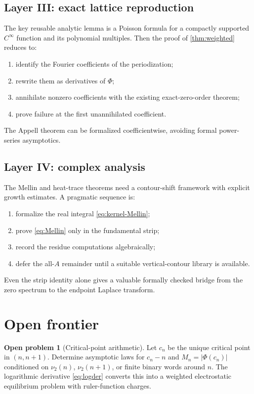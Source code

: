 \documentclass[11pt,oneside]{article}
\numberwithin{equation}{section}
\theoremstyle{definition}
\newtheorem{problem}[theorem]{Open problem}
\theoremstyle{remark}
\begin{document}
\subsection{Layer III: exact lattice reproduction}

The key reusable analytic lemma is a Poisson formula for a compactly supported
$C^\infty$ function and its polynomial multiples.  Then the proof of
\cref{thm:weighted} reduces to:
\begin{enumerate}
\item identify the Fourier coefficients of the periodization;
\item rewrite them as derivatives of $\Phi$;
\item annihilate nonzero coefficients with the existing exact-zero-order theorem;
\item prove failure at the first unannihilated coefficient.
\end{enumerate}
The Appell theorem can be formalized coefficientwise, avoiding formal power-series
asymptotics.

\subsection{Layer IV: complex analysis}

The Mellin and heat-trace theorems need a contour-shift framework with explicit
growth estimates.  A pragmatic sequence is:
\begin{enumerate}
\item formalize the real integral \eqref{eq:kernel-Mellin};
\item prove \eqref{eq:Mellin} only in the fundamental strip;
\item record the residue computations algebraically;
\item defer the all-$A$ remainder until a suitable vertical-contour library is
      available.
\end{enumerate}
Even the strip identity alone gives a valuable formally checked bridge from the
zero spectrum to the endpoint Laplace transform.

\section{Open frontier}
\label{sec:open}

\begin{problem}[Critical-point arithmetic]
Let $c_n$ be the unique critical point in $(n,n+1)$.  Determine asymptotic laws
for $c_n-n$ and $M_n=|\Phi(c_n)|$ conditioned on $\nu_2(n)$, $\nu_2(n+1)$, or
finite binary words around $n$.  The logarithmic derivative
\eqref{eq:logder} converts this into a weighted electrostatic equilibrium problem
with ruler-function charges.
\end{problem}
\end{document}
